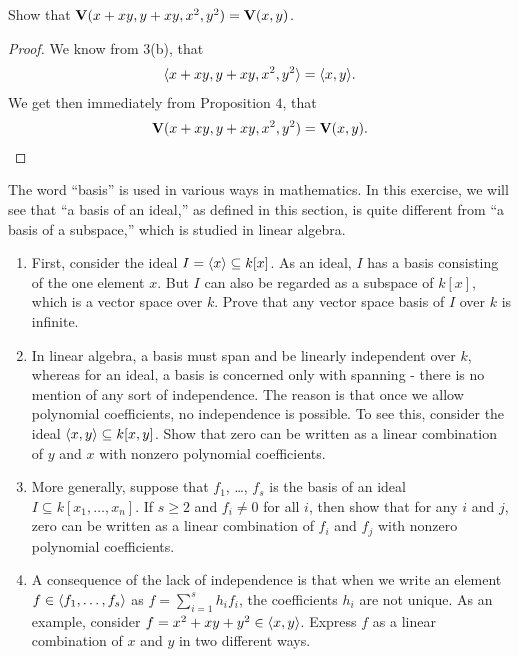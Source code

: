 \begin{exercise}{5}
    Show that $\mathbf{V}(x+xy,y+xy,x^2,y^2) = \mathbf{V}(x,y)$.
\end{exercise}
\begin{proof}
    We know from 3(b), that
    \begin{align*}
        \langle x+xy, y+xy, x^2, y^2\rangle = \langle x,y\rangle.
    \end{align*}
    We get then immediately from Proposition $4$, that
    \begin{align*}
        \mathbf{V}(x+xy,y+xy,x^2,y^2) = \mathbf{V}(x,y).
    \end{align*}
\end{proof}

\begin{exercise}{6}
The word ``basis'' is used in various ways in mathematics. 
In this exercise, we will see that ``a basis of an ideal,'' as defined in this section, is quite different from ``a basis of a subspace,'' which is studied in linear algebra.
\begin{enumerate}
    \item First, consider the ideal $I = \langle x\rangle\subseteq k[x]$. 
    As an ideal, $I$ has a basis consisting of the one element $x$. 
    But $I$ can also be regarded as a subspace of $k[x]$, which is a vector space over $k$. 
    Prove that any vector space basis of $I$ over $k$ is infinite.
    \item In linear algebra, a basis must span and be linearly independent over $k$, whereas for an ideal, a basis is concerned only with spanning - there is no mention of any sort of independence. 
    The reason is that once we allow polynomial coefficients, no independence is possible. 
    To see this, consider the ideal $\langle x,y\rangle \subseteq k[x,y]$. 
    Show that zero can be written as a linear combination of $y$ and $x$ with nonzero polynomial coefficients.
    \item More generally, suppose that $f_1$, \dots, $f_s$ is the basis of an ideal $I\subseteq k[x_1,\dots,x_n]$. 
    If $s\geq 2$ and $f_i\neq 0$ for all $i$, then show that for any $i$ and $j$, zero can be written as a linear combination of $f_i$ and $f_j$ with nonzero polynomial coefficients.
    \item A consequence of the lack of independence is that when we write an element $f\in \langle f_1,\dots,f_s\rangle$ as $f = \sum_{i=1}^s h_i f_i$, the coefficients $h_i$ are not unique. 
    As an example, consider $f = x^2 + xy + y^2\in \langle x,y\rangle$. 
    Express $f$ as a linear combination of $x$ and $y$ in two different ways. 

\end{enumerate}
\end{exercise}
